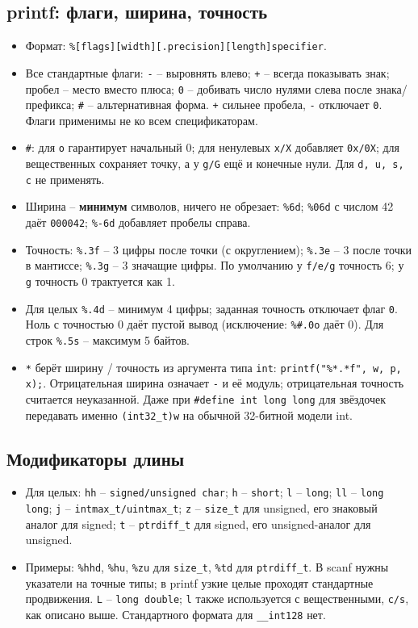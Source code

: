 \subsection{printf: флаги, ширина, точность}
\begin{itemize}[leftmargin=*, nosep]
\item Формат: \verb|%[flags][width][.precision][length]specifier|.
\item Все стандартные флаги: \verb|-| -- выровнять влево; \verb|+| -- всегда показывать знак; пробел -- место вместо плюса; \verb|0| -- добивать число нулями слева после знака/префикса; \verb|#| -- альтернативная форма. \verb|+| сильнее пробела, \verb|-| отключает \verb|0|. Флаги применимы не ко всем спецификаторам.
\item \verb|#|: для \verb|o| гарантирует начальный 0; для ненулевых \verb|x/X| добавляет \verb|0x/0X|; для вещественных сохраняет точку, а у \verb|g/G| ещё и конечные нули. Для \verb|d, u, s, c| не применять.
\item Ширина -- \textbf{минимум} символов, ничего не обрезает: \verb|%6d|; \verb|%06d| с числом 42 даёт \verb|000042|; \verb|%-6d| добавляет пробелы справа.
\item Точность: \verb|%.3f| -- 3 цифры после точки (с округлением); \verb|%.3e| -- 3 после точки в мантиссе; \verb|%.3g| -- 3 значащие цифры. По умолчанию у \verb|f/e/g| точность 6; у \verb|g| точность 0 трактуется как 1.
\item Для целых \verb|%.4d| -- минимум 4 цифры; заданная точность отключает флаг \verb|0|. Ноль с точностью 0 даёт пустой вывод (исключение: \verb|%#.0o| даёт 0). Для строк \verb|%.5s| -- максимум 5 байтов.
\item \verb|*| берёт ширину / точность из аргумента типа \verb|int|: \verb|printf("%*.*f", w, p, x);|. Отрицательная ширина означает \verb|-| и её модуль; отрицательная точность считается неуказанной. Даже при \verb|#define int long long| для звёздочек передавать именно \verb|(int32_t)w| на обычной 32-битной модели int.
\end{itemize}

\subsection{Модификаторы длины}
\begin{itemize}[leftmargin=*, nosep]
\item Для целых: \verb|hh| -- \verb|signed/unsigned char|; \verb|h| -- \verb|short|; \verb|l| -- \verb|long|; \verb|ll| -- \verb|long long|; \verb|j| -- \verb|intmax_t/uintmax_t|; \verb|z| -- \verb|size_t| для unsigned, его знаковый аналог для signed; \verb|t| -- \verb|ptrdiff_t| для signed, его unsigned-аналог для unsigned.
\item Примеры: \verb|%hhd|, \verb|%hu|, \verb|%zu| для \verb|size_t|, \verb|%td| для \verb|ptrdiff_t|. В scanf нужны указатели на точные типы; в printf узкие целые проходят стандартные продвижения. \verb|L| -- \verb|long double|; \verb|l| также используется с вещественными, \verb|c/s|, как описано выше. Стандартного формата для \verb|__int128| нет.
\end{itemize}


